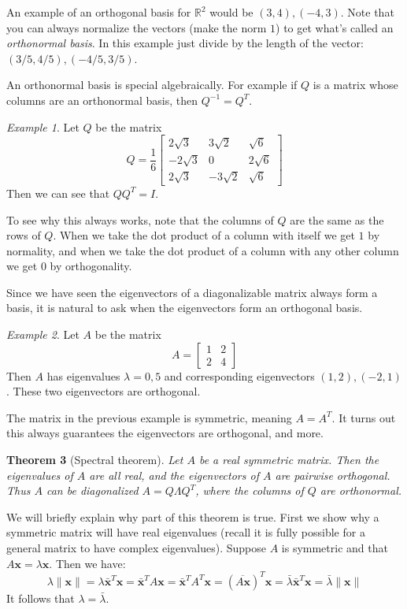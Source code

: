 \documentclass[11pt,oneside]{amsbook}
\newcommand{\R}{\mathbb R}
\theoremstyle{definition}
\theoremstyle{plain}
\newtheorem{theorem}{Theorem}[section]
\theoremstyle{definition}
\theoremstyle{remark}
\newtheorem{example}[theorem]{Example}
\numberwithin{equation}{section}
\numberwithin{figure}{section}
\begin{document}
An example of an orthogonal basis for $\R^2$ would be $(3,4),(-4,3)$. Note that you can always normalize the vectors (make the norm $1$) to get what's called an \emph{orthonormal basis}. In this example just divide by the length of the vector: $(3/5,4/5),(-4/5,3/5)$.

An orthonormal basis is special algebraically. For example if $Q$ is a matrix  whose columns are an orthonormal basis, then $Q^{-1}=Q^T$.

\begin{example}
  Let $Q$ be the matrix
  \[Q=\frac16\begin{bmatrix}
    2\sqrt{3}&3\sqrt{2}&\sqrt{6}\\
    -2\sqrt{3}&0&2\sqrt{6}\\
    2\sqrt{3}&-3\sqrt{2}&\sqrt{6}
  \end{bmatrix}
  \]
  Then we can see that $QQ^T=I$.
\end{example}

To see why this always works, note that the columns of $Q$ are the same as the rows of $Q$. When we take the dot product of a column with itself we get $1$ by normality, and when we take the dot product of a column with any other column we get $0$ by orthogonality.

Since we have seen the eigenvectors of a diagonalizable matrix always form a basis, it is natural to ask when the eigenvectors form an orthogonal basis.

\begin{example}
  Let $A$ be the matrix
  \[A=\begin{bmatrix}1&2\\2&4\end{bmatrix}
  \]
  Then $A$ has eigenvalues $\lambda=0,5$ and corresponding eigenvectors $(1,2),(-2,1)$. These two eigenvectors are orthogonal.
\end{example}

The matrix in the previous example is symmetric, meaning $A=A^T$. It turns out this always guarantees the eigenvectors are orthogonal, and more.

\begin{theorem}[Spectral theorem]
  Let $A$ be a real symmetric matrix. Then the eigenvalues of $A$ are all real, and the eigenvectors of $A$ are pairwise orthogonal. Thus $A$ can be diagonalized $A=Q\Lambda Q^T$, where the columns of $Q$ are orthonormal.
\end{theorem}

We will briefly explain why part of this theorem is true. First we show why a symmetric matrix will have real eigenvalues (recall it is fully possible for a general matrix to have complex eigenvalues). Suppose $A$ is symmetric and that $A\mathbf{x}=\lambda\mathbf{x}$. Then we have:
\[\lambda\|\mathbf{x}\|=\lambda \bar{\mathbf{x}}^T\mathbf{x}
  =\bar{\mathbf{x}}^TA\mathbf{x}
  =\bar{\mathbf{x}}^TA^T\mathbf{x}
  =(\overline{A\mathbf{x}})^T\mathbf{x}
  =\bar\lambda\bar{\mathbf{x}}^T\mathbf{x}
  =\bar\lambda\|\mathbf{x}\|
\]
It follows that $\lambda=\bar\lambda$.
\end{document}
